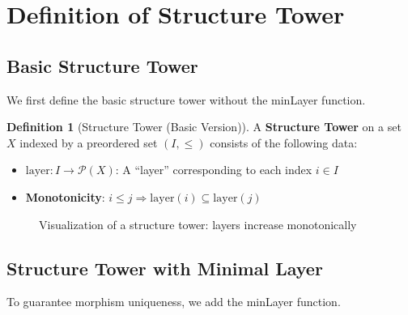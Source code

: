 \documentclass[11pt,a4paper]{article}
\theoremstyle{plain}
\theoremstyle{definition}
\newtheorem{definition}[theorem]{Definition}
\newcommand{\layer}{\mathrm{layer}}
\begin{document}
\section{Definition of Structure Tower}
\label{sec:definition}

\subsection{Basic Structure Tower}

We first define the basic structure tower without the minLayer function.

\begin{definition}[Structure Tower (Basic Version)]
\label{def:structure-tower-basic}
A \textbf{Structure Tower} on a set $X$ indexed by a preordered set $(I, \leq)$ 
consists of the following data:
\begin{itemize}
  \item $\layer : I \to \mathcal{P}(X)$: A ``layer'' corresponding to each index $i \in I$
  \item \textbf{Monotonicity}: $i \leq j \Rightarrow \layer(i) \subseteq \layer(j)$
\end{itemize}
\end{definition}

\begin{figure}[htbp]
\centering
{}
\caption{Visualization of a structure tower: layers increase monotonically}
\label{fig:tower-basic}
\end{figure}

\subsection{Structure Tower with Minimal Layer}

To guarantee morphism uniqueness, we add the minLayer function.
\end{document}

